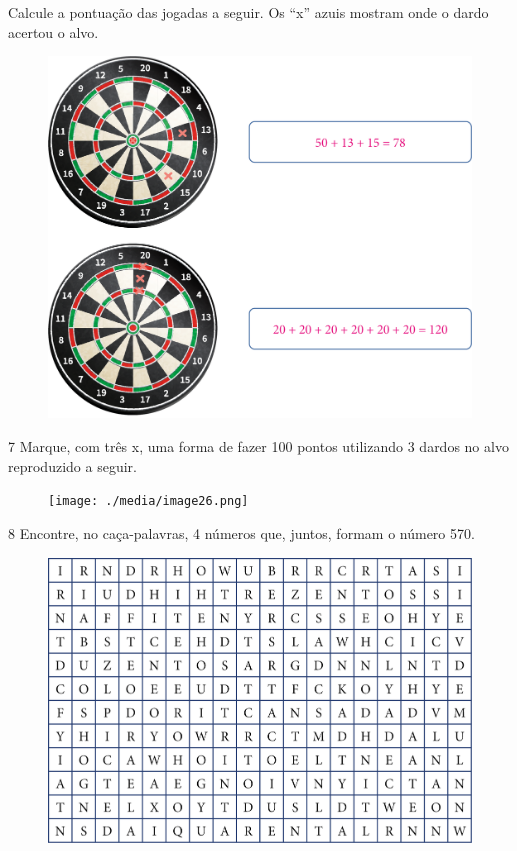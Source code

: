 Calcule a pontuação das jogadas a seguir. Os ``x'' azuis mostram onde o dardo acertou o alvo.


\begin{figure}[htpb!]
\includegraphics[width=.7\textwidth]{./media/image25.png}
\end{figure}

\pagebreak

\num{7} Marque, com três x, uma forma de fazer 100 pontos utilizando 3 dardos no alvo reproduzido a seguir.

\begin{figure}[htpb!]
\centering
\texttt{[image: ./media/image26.png]}
\end{figure}

\vspace*{-1em}


\vspace*{0.5em}

\num{8} Encontre, no caça-palavras, 4 números que, juntos, formam o número 570.

\begin{figure}[H]
\centering
\includegraphics[width=.8\textwidth]{./media/image27.png}
\end{figure}

